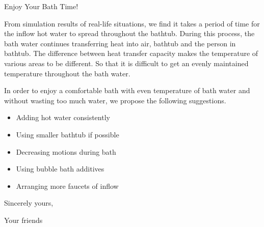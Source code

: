 \begin{letter}{Enjoy Your Bath Time!}

    From simulation results of real-life situations, we find it takes a period of time for the inflow hot water to spread throughout the bathtub. During this process, the bath water continues transferring heat into air, bathtub and the person in bathtub. The difference between heat transfer capacity makes the temperature of various areas to be different. So that it is difficult to get an evenly maintained temperature throughout the bath water.
    
    In order to enjoy a comfortable bath with even temperature of bath water and without wasting too much water, we propose the following suggestions.
    
    \begin{itemize}
    \item Adding hot water consistently
    \item Using smaller bathtub if possible
    \item Decreasing motions during bath
    \item Using bubble bath additives
    \item Arranging more faucets of inflow
    \end{itemize}
    
    \vspace{\parskip}
    
    Sincerely yours,
    
    Your friends
    
    \end{letter}
    
    \newpage
    